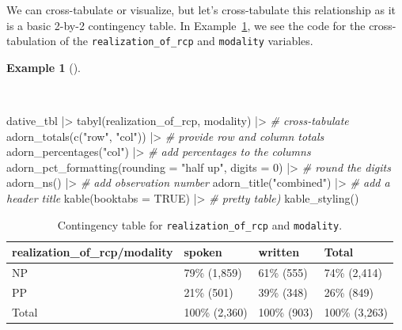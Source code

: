\documentclass[
  letterpaper,
]{latex/krantz}
\newenvironment{Shaded}{\begin{snugshade}}{\end{snugshade}}
\newcommand{\AttributeTok}[1]{\textcolor[rgb]{0.00,0.00,0.00}{#1}}
\newcommand{\CommentTok}[1]{\textcolor[rgb]{0.00,0.00,0.00}{\textit{#1}}}
\newcommand{\ConstantTok}[1]{\textcolor[rgb]{0.00,0.00,0.00}{#1}}
\newcommand{\DecValTok}[1]{\textcolor[rgb]{0.00,0.00,0.00}{#1}}
\newcommand{\FunctionTok}[1]{\textcolor[rgb]{0.00,0.00,0.00}{#1}}
\newcommand{\NormalTok}[1]{\textcolor[rgb]{0.00,0.00,0.00}{#1}}
\newcommand{\SpecialCharTok}[1]{\textcolor[rgb]{0.00,0.00,0.00}{#1}}
\newcommand{\StringTok}[1]{\textcolor[rgb]{0.00,0.00,0.00}{#1}}
\theoremstyle{definition}
\newtheorem{example}{Example}[chapter]
\theoremstyle{remark}
\begin{document}
We can cross-tabulate or visualize, but let's cross-tabulate this
relationship as it is a basic 2-by-2 contingency table. In
Example~\ref{exm-ida-cat-bivariate-tbl}, we see the code for the
cross-tabulation of the \texttt{realization\_of\_rcp} and
\texttt{modality} variables.

\begin{example}[]\protect\hypertarget{exm-ida-cat-bivariate-tbl}{}\label{exm-ida-cat-bivariate-tbl}

~

\begin{Shaded}
\begin{Highlighting}[]
\NormalTok{dative\_tbl }\SpecialCharTok{|\textgreater{}}
  \FunctionTok{tabyl}\NormalTok{(realization\_of\_rcp, modality) }\SpecialCharTok{|\textgreater{}} \CommentTok{\# cross{-}tabulate}
  \FunctionTok{adorn\_totals}\NormalTok{(}\FunctionTok{c}\NormalTok{(}\StringTok{"row"}\NormalTok{, }\StringTok{"col"}\NormalTok{)) }\SpecialCharTok{|\textgreater{}} \CommentTok{\# provide row and column totals}
  \FunctionTok{adorn\_percentages}\NormalTok{(}\StringTok{"col"}\NormalTok{) }\SpecialCharTok{|\textgreater{}} \CommentTok{\# add percentages to the columns}
  \FunctionTok{adorn\_pct\_formatting}\NormalTok{(}\AttributeTok{rounding =} \StringTok{"half up"}\NormalTok{, }\AttributeTok{digits =} \DecValTok{0}\NormalTok{) }\SpecialCharTok{|\textgreater{}} \CommentTok{\# round the digits}
  \FunctionTok{adorn\_ns}\NormalTok{() }\SpecialCharTok{|\textgreater{}} \CommentTok{\# add observation number}
  \FunctionTok{adorn\_title}\NormalTok{(}\StringTok{"combined"}\NormalTok{) }\SpecialCharTok{|\textgreater{}} \CommentTok{\# add a header title}
  \FunctionTok{kable}\NormalTok{(}\AttributeTok{booktabs =} \ConstantTok{TRUE}\NormalTok{) }\SpecialCharTok{|\textgreater{}}  \CommentTok{\# pretty table)}
  \FunctionTok{kable\_styling}\NormalTok{()}
\end{Highlighting}
\end{Shaded}

\begin{longtable}[t]{llll}

\caption{\label{tbl-ida-cat-bivariate}Contingency table for
\texttt{realization\_of\_rcp} and \texttt{modality}.}

\tabularnewline

\toprule
realization\_of\_rcp/modality & spoken & written & Total\\
\midrule
NP & 79\% (1,859) & 61\% (555) & 74\% (2,414)\\
PP & 21\%   (501) & 39\% (348) & 26\%   (849)\\
Total & 100\% (2,360) & 100\% (903) & 100\% (3,263)\\
\bottomrule

\end{longtable}

\end{example}
\end{document}
